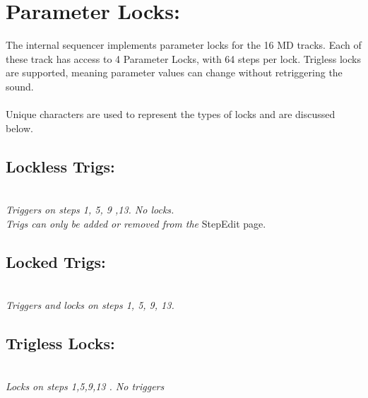 \chapter{Parameter Locks:}
The internal sequencer implements parameter locks for the 16 MD tracks. Each of these track has access to 4 Parameter Locks, with 64 steps per lock. Trigless locks are supported, meaning parameter values can change without retriggering the sound. \\\\Unique characters are used to represent the types of locks and are discussed below.
\section{Lockless Trigs:}
\\
\textit{Triggers on steps 1, 5, 9 ,13. No locks.\\
Trigs can only be added or removed from the} StepEdit page.\\
\section{Locked Trigs:}
\\
\textit{Triggers and locks on steps 1, 5, 9, 13.\\}
\section{Trigless Locks:}
\\
\textit{Locks on steps 1,5,9,13 . No triggers}
